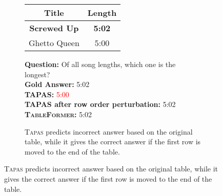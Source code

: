 \documentclass[11pt]{article}
\begin{document}
\begin{figure}[t!]
\centering
\footnotesize
\begin{subfigure}{\linewidth}
\begin{table}[H]
\centering
\footnotesize
\begin{tabular}{|c|c|}
\hline
\rowcolor[HTML]{FFCCC9} 
Title                     & Length        \\
\hline 
\rowcolor[HTML]{DAE8FC} 
\textbf{Screwed Up}  & \textbf{5:02} \\
\rowcolor[HTML]{DAE8FC} 
Ghetto Queen & 5:00  \\
\hline
\end{tabular}
\end{table}
\vspace{-1em}
\textbf{Question:} Of all song lengths, which one is the longest? \\
\textbf{Gold Answer:} 5:02 \\
\textbf{TAPAS:} \textcolor{red}{5:00} \\
\textbf{TAPAS after row order perturbation:} \textcolor{dg}{5:02} \\
\textbf{\textsc{TableFormer}:} \textcolor{dg}{5:02}
\caption{\textsc{Tapas} predicts incorrect answer based on the original table, while it gives the correct answer if the first row is moved to the end of the table.}
\end{subfigure}



\end{figure}
\end{document}
